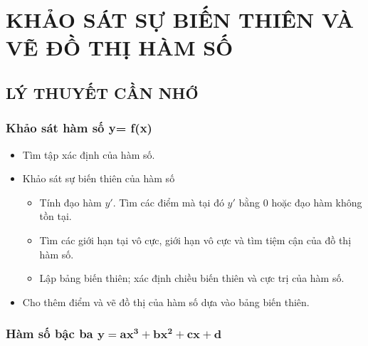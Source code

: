\setcounter{section}{3}
\section{KHẢO SÁT SỰ BIẾN THIÊN VÀ VẼ ĐỒ THỊ HÀM SỐ}
\subsection{LÝ THUYẾT CẦN NHỚ}
\subsubsection{Khảo sát hàm số y= f(x)}
\begin{itemize}
	\item[\iconCH]  Tìm tập xác định của hàm số.
	\item [\iconCH]  Khảo sát sự biến thiên của hàm số
	      \begin{itemize}
		      \item Tính đạo hàm $y'$. Tìm các điểm mà tại đó $y'$ bằng $0$ hoặc đạo hàm không tồn tại.
		      \item Tìm các giới hạn tại vô cực, giới hạn vô cực và tìm tiệm cận của đồ thị hàm số.
		      \item Lập bảng biến thiên; xác định chiều biến thiên và cực trị của hàm số.
	      \end{itemize}
	\item [\iconCH]  Cho thêm điểm và vẽ đồ thị của hàm số dựa vào bảng biến thiên.
\end{itemize}

\subsubsection{Hàm số bậc ba $\mathbf{y=ax^3+bx^2+cx+d}$}

